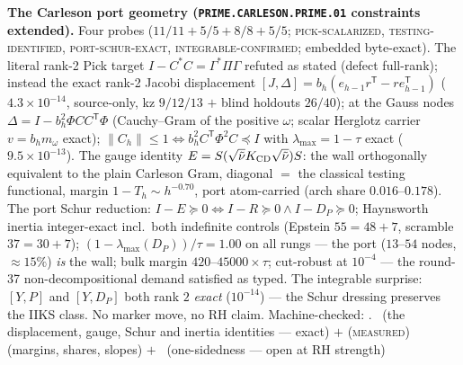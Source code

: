 \documentclass[11pt,a4paper]{article}
\theoremstyle{definition}
\begin{document}
\par\smallskip\noindent\textbf{The Carleson port geometry
(\texttt{PRIME.CARLESON.\allowbreak PRIME.01} constraints
extended).}
Four probes ($11/11 + 5/5 + 8/8 + 5/5$;
\textsc{pick-scalarized}, \textsc{testing-identified},
\textsc{port-schur-exact}, \textsc{integrable-confirmed};
embedded byte-exact).  The literal rank-2 Pick target $I - C^{*}C
= \Gamma^{*}\Pi\Gamma$ refuted as stated (defect full-rank);
instead the exact rank-2 Jacobi displacement $[J, \Delta] =
b_h(e_{h-1}r^{\mathsf T} - re_{h-1}^{\mathsf T})$
($4.3\times10^{-14}$, source-only, kz $9/12/13$ $+$ blind
holdouts $26/40$); at the Gauss nodes $\Delta = I -
b_h^2\Phi CC^{\mathsf T}\Phi$ (Cauchy--Gram of the positive
$\omega$; scalar Herglotz carrier $v = b_h m_\omega$ exact);
$\|C_h\| \le 1 \Leftrightarrow b_h^2 C^{\mathsf T}\Phi^2 C
\preceq I$ with $\lambda_{\max} = 1 - \tau$ exact
($9.5\times10^{-13}$).  The gauge identity $E =
S(\sqrt{\tilde\nu}K_{\rm CD}\sqrt{\tilde\nu})S$: the wall
orthogonally equivalent to the plain Carleson Gram, diagonal $=$
the classical testing functional, margin $1 - T_h \sim
h^{-0.70}$, port atom-carried (arch share $0.016$--$0.178$).
The port Schur reduction: $I - E \succeq 0 \Leftrightarrow I - R
\succeq 0 \wedge I - D_P \succeq 0$; Haynsworth inertia
integer-exact incl.\ both indefinite controls (Epstein $55 = 48 +
7$, scramble $37 = 30 + 7$); $(1 - \lambda_{\max}(D_P))/\tau =
1.00$ on all rungs --- the port ($13$--$54$ nodes,
${\approx}15\%$) \emph{is} the wall; bulk margin
$420$--$45000\times\tau$; cut-robust at $10^{-4}$ --- the
round-37 non-decompositional demand satisfied as typed.  The
integrable surprise: $[Y, P]$ and $[Y, D_P]$ both rank $2$
\emph{exact} ($10^{-14}$) --- the Schur dressing preserves the
IIKS class.  No marker move, no RH claim.
Machine-checked: .
\mE\ (the displacement, gauge, Schur and inertia identities ---
exact) $+$ (\textsc{measured}) (margins, shares, slopes) $+$
\mO\ (one-sidedness --- open at RH strength)
\par\smallskip
\end{document}
